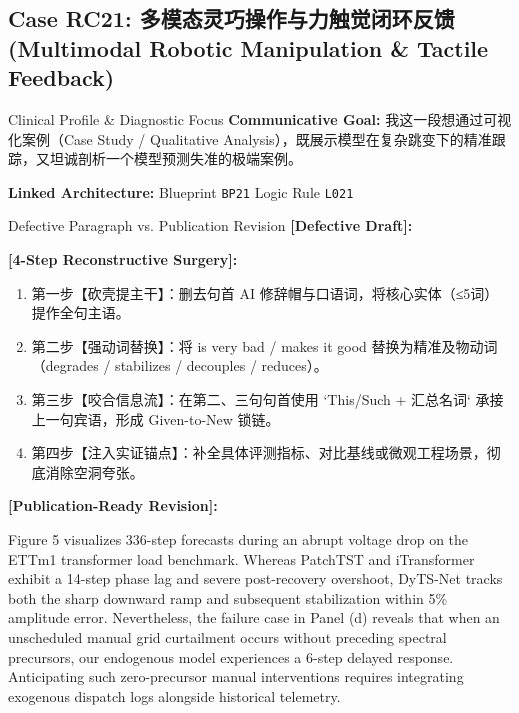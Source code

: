 \subsection{Case RC21: 多模态灵巧操作与力触觉闭环反馈 (Multimodal Robotic Manipulation \& Tactile Feedback)}\label{case:RC21}
\begin{ConceptBox}{Clinical Profile \& Diagnostic Focus}
\textbf{Communicative Goal:} 我这一段想通过可视化案例（Case Study / Qualitative Analysis），既展示模型在复杂跳变下的精准跟踪，又坦诚剖析一个模型预测失准的极端案例。\par
\textbf{Linked Architecture:} Blueprint \texttt{BP21} \enspace\textbar\enspace Logic Rule \texttt{L021}
\end{ConceptBox}
\begin{ExampleBox}{Defective Paragraph vs. Publication Revision}
\textbf{\color{TargetHighlight}[Defective Draft]:}\par
{}\par\vspace{6pt}
\textbf{\color{AcadForest}[4-Step Reconstructive Surgery]:}
\begin{enumerate}[label=\textbf{\color{AcadNavy}Step \arabic*:}, leftmargin=2em]
  \item 第一步【砍壳提主干】：删去句首 AI 修辞帽与口语词，将核心实体（≤5词）提作全句主语。
  \item 第二步【强动词替换】：将 is very bad / makes it good 替换为精准及物动词（degrades / stabilizes / decouples / reduces）。
  \item 第三步【咬合信息流】：在第二、三句句首使用 `This/Such + 汇总名词` 承接上一句宾语，形成 Given-to-New 锁链。
  \item 第四步【注入实证锚点】：补全具体评测指标、对比基线或微观工程场景，彻底消除空洞夸张。
\end{enumerate}\vspace{4pt}
\textbf{\color{AcadNavy}[Publication-Ready Revision]:}\par
Figure 5 visualizes 336-step forecasts during an abrupt voltage drop on the ETTm1 transformer load benchmark. Whereas PatchTST and iTransformer exhibit a 14-step phase lag and severe post-recovery overshoot, DyTS-Net tracks both the sharp downward ramp and subsequent stabilization within 5\% amplitude error. Nevertheless, the failure case in Panel (d) reveals that when an unscheduled manual grid curtailment occurs without preceding spectral precursors, our endogenous model experiences a 6-step delayed response. Anticipating such zero-precursor manual interventions requires integrating exogenous dispatch logs alongside historical telemetry.
\end{ExampleBox}
